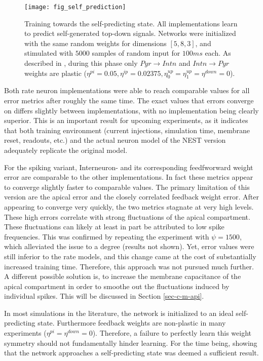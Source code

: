 \begin{figure}[h]
    \centering
    \texttt{[image: fig\_self\_prediction]}
    \caption[Training towards the self-predicting state]{Training towards the self-predicting state. All implementations
        learn to predict self-generated top-down signals. Networks were initialized with the same random weights for
        dimensions $[5, 8, 3]$, and stimulated with $5000$ samples of random input for $100ms$ each. As described in
        \citep{sacramento2018dendritic}, during this phase only $Pyr \rightarrow Intn$ and $Intn \rightarrow Pyr$
        weights are plastic ($\eta^{pi}=0.05, \eta^{ip}=0.02375, \eta^{up}_0=\eta^{up}_1=\eta^{down}=0$).}
    \label{fig-self-pred}
\end{figure}

Both rate neuron implementations were able to reach comparable values for all error metrics after roughly the same time.
The exact values that errors converge on differs slightly between implementations, with no implementation being clearly
superior. This is an important result for upcoming experiments, as it indicates that both training environment (current
injections, simulation time, membrane reset, readouts, etc.) and the actual neuron model of the NEST version adequately
replicate the original model.

For the spiking variant, Interneuron- and its corresponding feedfworward weight error are comparable to the other
implementations. In fact these metrics appear to converge slightly faster to comparable values. The primary limitation
of this version are the apical error and the closely correlated feedback weight error. After appearing to converge very
quickly, the two metrics stagnate at very high levels. These high errors correlate with strong fluctuations of the
apical compartment. These fluctuations can likely at least in part be attributed to low spike frequencies. This was
confirmed by repeating the experiment with $\psi=1500$, which alleviated the issue to a degree (results not shown). Yet,
error values were still inferior to the rate models, and this change came at the cost of substantially increased
training time. Therefore, this approach was not pursued much further. A different possible solution is, to increase the
membrane capacitance of the apical compartment in order to smoothe out the fluctuations induced by individual spikes.
This will be discussed in Section \ref{sec-c-m-api}.

In most simulations in the literature, the network is initialized to an ideal self-predicting state. Furthermore
feedback weights are non-plastic in many experiments ($\eta^{pi}=\eta^{down}=0$). Therefore, a failure to perfectly
learn this weight symmetry should not fundamentally hinder learning. For the time being, showing that the network
approaches a self-predicting state was deemed a sufficient result.


